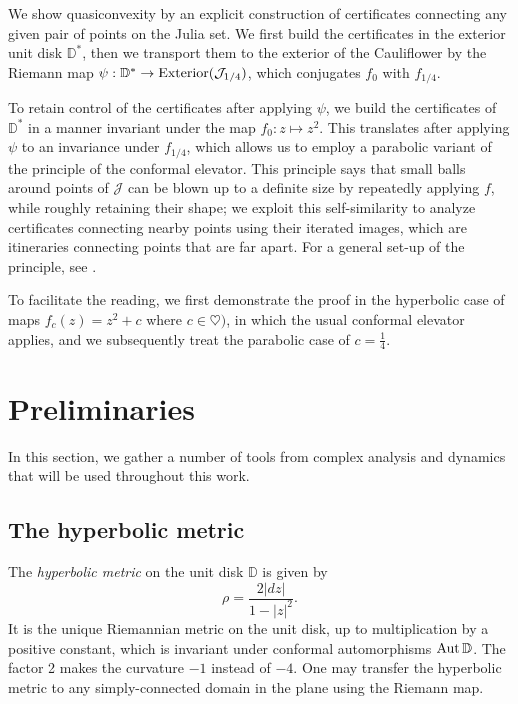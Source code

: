 We show quasiconvexity by an explicit construction of certificates connecting any given pair of points on the Julia set.
We first build the certificates in the exterior unit disk $\mathbb D ^*$, 
then we transport them to the exterior of the Cauliflower by the Riemann map $\psi: \mathbb D ^* \to \operatorname{Exterior}(\mathcal J_{1 / 4})$, 
which conjugates $f_0$ with $f_{1/4}$.

To retain control of the certificates after applying $\psi$, 
we build the certificates of $\mathbb D^*$ in a manner invariant under the map $f_0: z\mapsto z^2$.
This translates after applying $\psi$ to an invariance under $f_{1/4}$,
which allows us to employ a parabolic variant of the principle of the conformal elevator.
This principle says that small balls around points of $\mathcal J$ can be blown up to a definite size by repeatedly applying $f$, while roughly retaining their shape; we exploit this self-similarity to analyze certificates connecting nearby points using their iterated images, which are itineraries connecting points that are far apart. For a general set-up of the principle, see \cite[pages 20-21]{bonk2014quasisymmetries}.

To facilitate the reading, we first demonstrate the proof in the hyperbolic case of maps $f_c(z)=z^2+c$ where 
$c\in \heartsuit)$, in which the usual conformal elevator applies, 
and we subsequently treat the parabolic case of $c=\frac{1}{4}$.

\section{Preliminaries}

In this section, we gather a number of tools from complex analysis and dynamics that will be used throughout this work.

\subsection{The hyperbolic metric}
	The {\em hyperbolic metric} on the unit disk $\mathbb D$ is given by
	\begin{equation}
	\label{eq:hyp-metric-in-disk}
		\rho = \frac {2|dz|}{1-|z|^2}.
	\end{equation}
It is the unique Riemannian metric on the unit disk, up to multiplication by a positive constant, which is invariant under conformal automorphisms $\operatorname{Aut} \mathbb{D}$. The factor 2 makes the curvature $-1$ instead of $-4$. One may transfer the hyperbolic metric to any simply-connected domain in the plane using the Riemann map.


